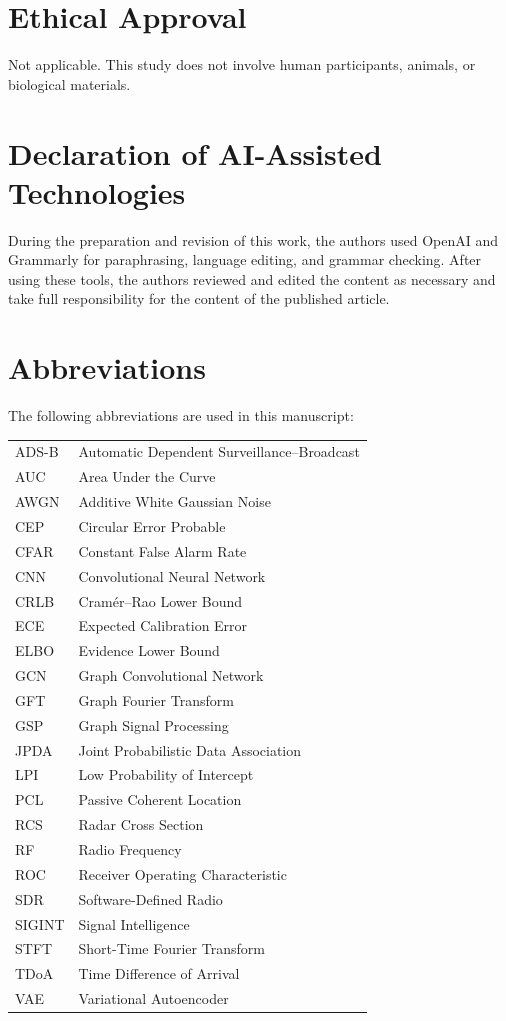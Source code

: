 \documentclass[sensors,article,submit,pdftex]{mdpi}
\begin{document}
\section*{Ethical Approval}
Not applicable. This study does not involve human participants, animals, or biological materials.

\section*{Declaration of AI-Assisted Technologies}
During the preparation and revision of this work, the authors used OpenAI and Grammarly for paraphrasing, language editing, and grammar checking. After using these tools, the authors reviewed and edited the content as necessary and take full responsibility for the content of the published article.

\section*{Abbreviations}
The following abbreviations are used in this manuscript:

\noindent
\begin{tabular}{@{}ll@{}}
ADS-B & Automatic Dependent Surveillance--Broadcast \\
AUC & Area Under the Curve \\
AWGN & Additive White Gaussian Noise \\
CEP & Circular Error Probable \\
CFAR & Constant False Alarm Rate \\
CNN & Convolutional Neural Network \\
CRLB & Cram\'{e}r--Rao Lower Bound \\
ECE & Expected Calibration Error \\
ELBO & Evidence Lower Bound \\
GCN & Graph Convolutional Network \\
GFT & Graph Fourier Transform \\
GSP & Graph Signal Processing \\
JPDA & Joint Probabilistic Data Association \\
LPI & Low Probability of Intercept \\
PCL & Passive Coherent Location \\
RCS & Radar Cross Section \\
RF & Radio Frequency \\
ROC & Receiver Operating Characteristic \\
SDR & Software-Defined Radio \\
SIGINT & Signal Intelligence \\
STFT & Short-Time Fourier Transform \\
TDoA & Time Difference of Arrival \\
VAE & Variational Autoencoder \\
\end{tabular}
\end{document}
